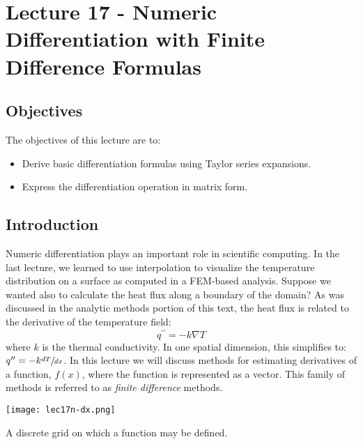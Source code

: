 \chapter{Lecture 17 - Numeric Differentiation with Finite Difference Formulas}
\label{ch:lec17n}
\section{Objectives}
The objectives of this lecture are to:
\begin{itemize}
\item Derive basic differentiation formulas using Taylor series expansions.
\item Express the differentiation operation in matrix form.
\end{itemize}
\setcounter{lstannotation}{0}

\section{Introduction}
Numeric differentiation plays an important role in scientific computing.  In the last lecture, we learned to use interpolation to visualize the temperature distribution on a surface as computed in a FEM-based analysis.  Suppose we wanted also to calculate the heat flux along a boundary of the domain?  As was discussed in the analytic methods portion of this text, the heat flux is related to the derivative of the temperature field:
\begin{equation*}
q^{\prime \prime} = -k \nabla T
\end{equation*}
where $k$ is the thermal conductivity.  In one spatial dimension, this simplifies to: $q^{\prime \prime} = -k \sfrac{dT}{dx}$.
In this lecture we will discuss methods for estimating derivatives of a function, $f(x)$, where the function is represented as a vector.  This family of methods is referred to as \emph{finite difference} methods.

\begin{marginfigure}
\texttt{[image: lec17n-dx.png]}
\caption{A discrete grid on which a function may be defined.}
\label{fig:lec17n-dx}
\end{marginfigure}
